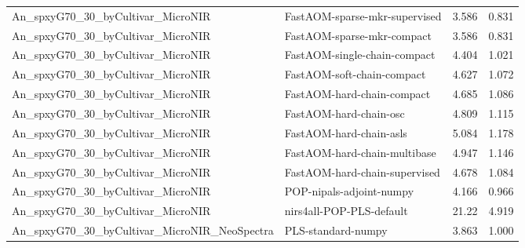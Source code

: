 \begin{landscape}
\begin{longtable}{L{8.0cm}L{9.5cm}rr}
An\_\allowbreak{}spxyG70\_\allowbreak{}30\_\allowbreak{}byCultivar\_\allowbreak{}MicroNIR & FastAOM-\allowbreak{}sparse-\allowbreak{}mkr-\allowbreak{}supervised & 3.586 & 0.831 \\
An\_\allowbreak{}spxyG70\_\allowbreak{}30\_\allowbreak{}byCultivar\_\allowbreak{}MicroNIR & FastAOM-\allowbreak{}sparse-\allowbreak{}mkr-\allowbreak{}compact & 3.586 & 0.831 \\
An\_\allowbreak{}spxyG70\_\allowbreak{}30\_\allowbreak{}byCultivar\_\allowbreak{}MicroNIR & FastAOM-\allowbreak{}single-\allowbreak{}chain-\allowbreak{}compact & 4.404 & 1.021 \\
An\_\allowbreak{}spxyG70\_\allowbreak{}30\_\allowbreak{}byCultivar\_\allowbreak{}MicroNIR & FastAOM-\allowbreak{}soft-\allowbreak{}chain-\allowbreak{}compact & 4.627 & 1.072 \\
An\_\allowbreak{}spxyG70\_\allowbreak{}30\_\allowbreak{}byCultivar\_\allowbreak{}MicroNIR & FastAOM-\allowbreak{}hard-\allowbreak{}chain-\allowbreak{}compact & 4.685 & 1.086 \\
An\_\allowbreak{}spxyG70\_\allowbreak{}30\_\allowbreak{}byCultivar\_\allowbreak{}MicroNIR & FastAOM-\allowbreak{}hard-\allowbreak{}chain-\allowbreak{}osc & 4.809 & 1.115 \\
An\_\allowbreak{}spxyG70\_\allowbreak{}30\_\allowbreak{}byCultivar\_\allowbreak{}MicroNIR & FastAOM-\allowbreak{}hard-\allowbreak{}chain-\allowbreak{}asls & 5.084 & 1.178 \\
An\_\allowbreak{}spxyG70\_\allowbreak{}30\_\allowbreak{}byCultivar\_\allowbreak{}MicroNIR & FastAOM-\allowbreak{}hard-\allowbreak{}chain-\allowbreak{}multibase & 4.947 & 1.146 \\
An\_\allowbreak{}spxyG70\_\allowbreak{}30\_\allowbreak{}byCultivar\_\allowbreak{}MicroNIR & FastAOM-\allowbreak{}hard-\allowbreak{}chain-\allowbreak{}supervised & 4.678 & 1.084 \\
An\_\allowbreak{}spxyG70\_\allowbreak{}30\_\allowbreak{}byCultivar\_\allowbreak{}MicroNIR & POP-\allowbreak{}nipals-\allowbreak{}adjoint-\allowbreak{}numpy & 4.166 & 0.966 \\
An\_\allowbreak{}spxyG70\_\allowbreak{}30\_\allowbreak{}byCultivar\_\allowbreak{}MicroNIR & nirs4all-\allowbreak{}POP-\allowbreak{}PLS-\allowbreak{}default & 21.22 & 4.919 \\
An\_\allowbreak{}spxyG70\_\allowbreak{}30\_\allowbreak{}byCultivar\_\allowbreak{}MicroNIR\_\allowbreak{}NeoSpectra & PLS-\allowbreak{}standard-\allowbreak{}numpy & 3.863 & 1.000 \\

\end{longtable}
\end{landscape}
